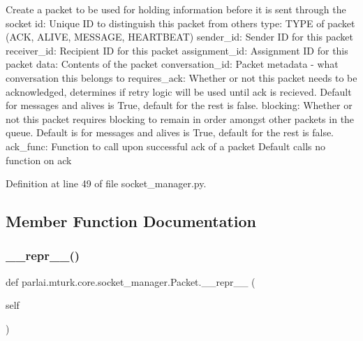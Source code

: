 \begin{DoxyVerb}Create a packet to be used for holding information before it is
sent through the socket
id:               Unique ID to distinguish this packet from others
type:             TYPE of packet (ACK, ALIVE, MESSAGE, HEARTBEAT)
sender_id:        Sender ID for this packet
receiver_id:      Recipient ID for this packet
assignment_id:    Assignment ID for this packet
data:             Contents of the packet
conversation_id:  Packet metadata - what conversation this belongs to
requires_ack:     Whether or not this packet needs to be acknowledged,
           determines if retry logic will be used until ack is
           recieved. Default for messages and alives is True,
           default for the rest is false.
blocking:         Whether or not this packet requires blocking to
           remain in order amongst other packets in the queue.
           Default is for messages and alives is True, default
           for the rest is false.
ack_func:         Function to call upon successful ack of a packet
           Default calls no function on ack
\end{DoxyVerb}
 

Definition at line 49 of file socket\+\_\+manager.\+py.



\subsection{Member Function Documentation}
\mbox{\label{classparlai_1_1mturk_1_1core_1_1socket__manager_1_1Packet_a140e38046a95501d5a7798f04b1553bb}} 
\subsubsection{\texorpdfstring{\+\_\+\+\_\+repr\+\_\+\+\_\+()}{\_\_repr\_\_()}}
{\footnotesize\ttfamily def parlai.\+mturk.\+core.\+socket\+\_\+manager.\+Packet.\+\_\+\+\_\+repr\+\_\+\+\_\+ (\begin{DoxyParamCaption}\item[{}]{self }\end{DoxyParamCaption})}



